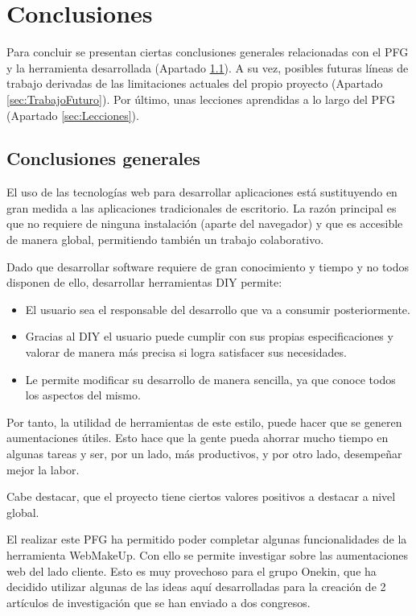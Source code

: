 \chapter{Conclusiones}
\label{cha:conclusiones}

Para concluir se presentan ciertas conclusiones generales relacionadas con el PFG y la herramienta desarrollada (Apartado \ref{sec:ConclusionesGenerales}). A su vez, posibles futuras líneas de trabajo derivadas de las limitaciones actuales del propio proyecto (Apartado \ref{sec:TrabajoFuturo}). Por último, unas lecciones aprendidas a lo largo del PFG (Apartado \ref{sec:Lecciones}).

\section{Conclusiones generales}
\label{sec:ConclusionesGenerales}

El uso de las tecnologías web para desarrollar aplicaciones está sustituyendo en gran medida a las aplicaciones tradicionales de escritorio. La razón principal es que no requiere de ninguna instalación (aparte del navegador) y que es accesible de manera global, permitiendo también un trabajo colaborativo.

Dado que desarrollar software requiere de gran conocimiento y tiempo y no todos disponen de ello, desarrollar herramientas DIY permite:
\begin{itemize}
\item{El usuario sea el responsable del desarrollo que va a consumir posteriormente.}
\item{Gracias al DIY el usuario puede cumplir con sus propias especificaciones y valorar de manera más precisa si logra satisfacer sus necesidades.}
\item{Le permite modificar su desarrollo de manera sencilla, ya que conoce todos los aspectos del mismo.}
\end{itemize}

Por tanto, la utilidad de herramientas de este estilo, puede hacer que se generen aumentaciones útiles. Esto hace que la gente pueda ahorrar mucho tiempo en algunas tareas y ser, por un lado, más productivos, y por otro lado, desempeñar mejor la labor.

Cabe destacar, que el proyecto tiene ciertos valores positivos a destacar a nivel global.

El realizar este PFG ha permitido poder completar algunas funcionalidades de la herramienta WebMakeUp. Con ello se permite investigar sobre las aumentaciones web del lado cliente. Esto es muy provechoso para el grupo Onekin, que ha decidido utilizar algunas de las ideas aquí desarrolladas para la creación de 2 artículos de investigación que se han enviado a dos congresos. 

